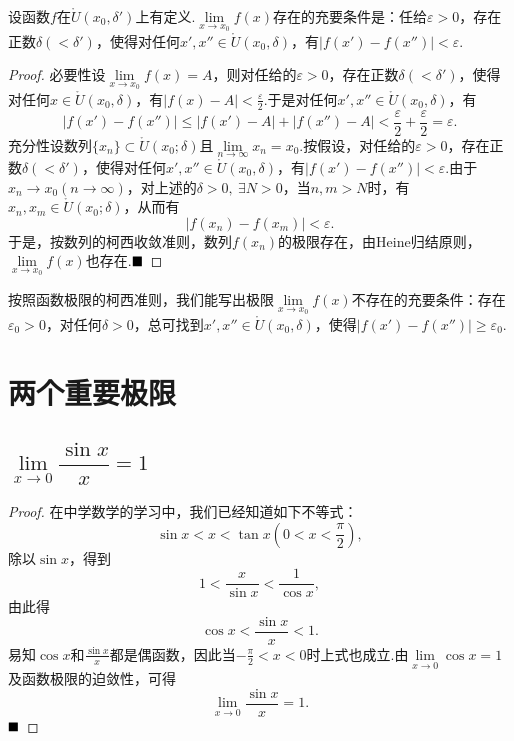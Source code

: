 \begin{theorem}[Cauchy准则]
	设函数$f$在$\mathring{U}(x_0,\delta')$上有定义.$\lim\limits_{x\to x_0}f(x)$存在的充要条件是：任给$\varepsilon>0$，存在正数$\delta(<\delta')$，使得对任何$x',x''\in\mathring{U}(x_0,\delta)$，有$|f(x')-f(x'')|<\varepsilon$.
\end{theorem}
\begin{proof}
	必要性\qquad 设$\lim\limits_{x\to x_0}f(x)=A$，则对任给的$\varepsilon>0$，存在正数$\delta(<\delta')$，使得对任何$x\in \mathring{U}(x_0,\delta)$，有$|f(x)-A|<\frac{\varepsilon}{2}$.于是对任何$x',x''\in\mathring{U}(x_0,\delta)$，有
	$$|f(x')-f(x'')|\leqslant|f(x')-A|+|f(x'')-A|<\frac{\varepsilon}{2}+\frac{\varepsilon}{2}=\varepsilon.$$
	充分性\qquad 设数列$\{x_n\}\subset \mathring{U}(x_0;\delta)$且$\lim\limits_{n\to \infty}x_n=x_0$.按假设，对任给的$\varepsilon>0$，存在正数$\delta(<\delta')$，使得对任何$x',x''\in\mathring{U}(x_0,\delta)$，有$|f(x')-f(x'')|<\varepsilon$.由于$x_n\to x_0(n\to \infty)$，对上述的$\delta>0,\ \exists N>0$，当$n,m>N$时，有$x_n,x_m\in \mathring{U}(x_0;\delta)$，从而有
	$$|f(x_n)-f(x_m)|<\varepsilon.$$
	于是，按数列的柯西收敛准则，数列$f(x_n)$的极限存在，由Heine归结原则，$\lim\limits_{x\to x_0}f(x)$也存在.$\hfill\blacksquare$
\end{proof}
按照函数极限的柯西准则，我们能写出极限$\lim\limits_{x\to x_0}f(x)$不存在的充要条件：存在$\varepsilon_0>0$，对任何$\delta>0$，总可找到$x',x''\in\mathring{U}(x_0,\delta)$，使得$|f(x')-f(x'')|\geqslant\varepsilon_0$.
\section{两个重要极限}
\subsection{$\lim\limits_{x\to 0}\dfrac{\sin x}{x}=1$}
\begin{proof}
	在中学数学的学习中，我们已经知道如下不等式：
	$$\sin x<x<\tan x(0<x<\frac{\pi}{2}),$$
	除以$\sin x$，得到
	$$1<\frac{x}{\sin x}<\frac{1}{\cos x},$$
	由此得
	$$\cos x<\frac{\sin x}{x}<1.$$
	易知$\cos x$和$\frac{\sin x}{x}$都是偶函数，因此当$-\frac{\pi}{2}<x<0$时上式也成立.由$\lim\limits_{x\to 0}\cos x=1$及函数极限的迫敛性，可得
	$$\lim\limits_{x\to 0}\frac{\sin x}{x}=1.$$
	$\hfill\blacksquare$
\end{proof}

